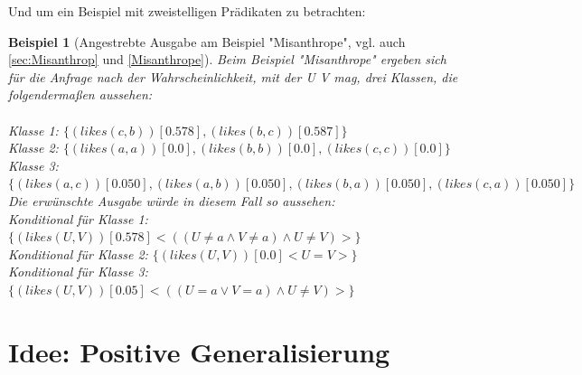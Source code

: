 \documentclass[a4paper, 11pt]{book}
\newtheorem{Bsp}{Beispiel}[section]
\begin{document}
Und um ein Beispiel mit zweistelligen Prädikaten zu betrachten: 

	\label{Ausgabe_Misanthrope}
	\begin{Bsp}[Angestrebte Ausgabe am Beispiel "{}Misanthrope"{}, vgl. auch \ref{sec:Misanthrop} und \ref{Misanthrope}]
		Beim Beispiel "{}Misanthrope"{} ergeben sich für die Anfrage nach der Wahrscheinlichkeit, mit der U V mag, drei Klassen, die folgendermaßen aussehen:\\
		\\
		Klasse 1: $ \{(likes(c,b))[0.578], (likes(b,c))[0.587]\} $\\
		Klasse 2: $ \{(likes(a,a))[0.0], (likes(b,b))[0.0], (likes(c,c))[0.0]\} $\\
		Klasse 3: $ \{(likes(a,c))[0.050], (likes(a,b))[0.050], (likes(b,a))[0.050], (likes(c,a))[0.050]\} $\\
		
		\noindent
		Die erwünschte Ausgabe würde in diesem Fall so aussehen:\\
		Konditional für Klasse 1: $ \{(likes(U,V))[0.578] <((U \neq a \land V \neq a) \land U \neq V)>\} $\\
		Konditional für Klasse 2: $ \{(likes(U,V))[0.0] <U = V>\} $\\
		Konditional für Klasse 3: $ \{(likes(U,V))[0.05] <((U = a \lor V = a) \land U \neq V)>\} $\\
	\end{Bsp}


\section{Idee: Positive Generalisierung}
\label{PositiveGeneralisierung}
\end{document}
